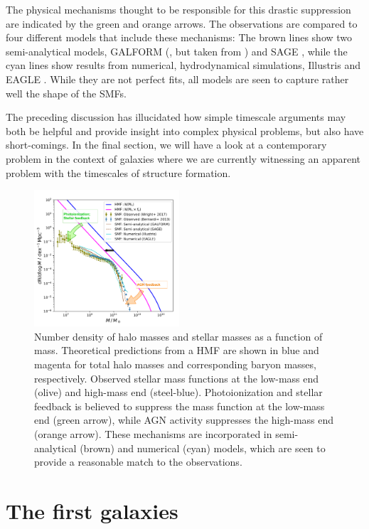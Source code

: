\documentclass[useAMS,usenatbib,bibyear]{aa}
\begin{document}
The physical mechanisms thought to be responsible for this drastic suppression are indicated by the green and orange arrows.
The observations are compared to four different models that include these mechanisms: 
The brown lines show two semi-analytical models, GALFORM (\citealt{Gonzalez-perez2014}, but taken from \citealt{Somerville2015a}) and SAGE \citep{Croton2016}, while the cyan lines show results from numerical, hydrodynamical simulations, Illustris \citep{Vogelsberger2014} and EAGLE \citep{Schaye2015}.
While they are not perfect fits, all models are seen to capture rather well the shape of the SMFs.

The preceding discussion has illucidated how simple timescale arguments may both be helpful and provide insight into complex physical problems, but also have short-comings. In the final section, we will have a look at a contemporary problem in the context of galaxies where we are currently witnessing an apparent problem with the timescales of structure formation.

\begin{figure}[!t]
    \centering
    \includegraphics [width=0.48\textwidth] {hmf2smf-annotated.pdf}
    \caption{Number density of halo masses and stellar masses as a function of mass.
    Theoretical predictions from a HMF are shown in blue and magenta for total halo masses and corresponding baryon masses, respectively.
    Observed stellar mass functions at the low-mass end (olive) and high-mass end (steel-blue).
    Photoionization and stellar feedback is believed to suppress the mass function at the low-mass end (green arrow), while AGN activity suppresses the high-mass end (orange arrow).
    These mechanisms are incorporated in semi-analytical (brown) and numerical (cyan) models, which are seen to provide a reasonable match to the observations.}
    \label{fig:hmf2smf}
\end{figure}

\section{The first galaxies}
\label{sec:jwst}
\end{document}
